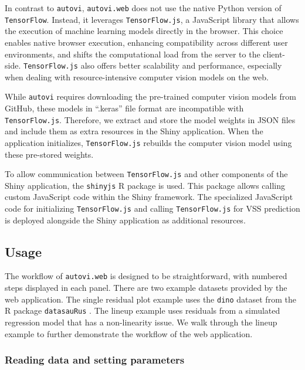 \documentclass[
doublespace,
  times]{anzsauth}
\begin{document}
In contrast to \texttt{autovi}, \texttt{autovi.web} does not use the
native Python version of \texttt{TensorFlow}. Instead, it leverages
\texttt{TensorFlow.js}, a JavaScript library that allows the execution
of machine learning models directly in the browser. This choice enables
native browser execution, enhancing compatibility across different user
environments, and shifts the computational load from the server to the
client-side. \texttt{TensorFlow.js} also offers better scalability and
performance, especially when dealing with resource-intensive computer
vision models on the web.

While \texttt{autovi} requires downloading the pre-trained computer
vision models from GitHub, these models in ``.keras'' file format are
incompatible with \texttt{TensorFlow.js}. Therefore, we extract and
store the model weights in JSON files and include them as extra
resources in the Shiny application. When the application initializes,
\texttt{TensorFlow.js} rebuilds the computer vision model using these
pre-stored weights.

To allow communication between \texttt{TensorFlow.js} and other
components of the Shiny application, the \texttt{shinyjs} R package
\citep{shinyjs} is used. This package allows calling custom JavaScript
code within the Shiny framework. The specialized JavaScript code for
initializing \texttt{TensorFlow.js} and calling \texttt{TensorFlow.js}
for VSS prediction is deployed alongside the Shiny application as
additional resources.

\subsection{Usage}\label{sec-autovi-web-workflow}

The workflow of \texttt{autovi.web} is designed to be straightforward,
with numbered steps displayed in each panel. There are two example
datasets provided by the web application. The single residual plot
example uses the \texttt{dino} dataset from the R package
\texttt{datasauRus} \citep{datasaurus}. The lineup example uses
residuals from a simulated regression model that has a non-linearity
issue. We walk through the lineup example to further demonstrate the
workflow of the web application.

\subsubsection{Reading data and setting
parameters}\label{reading-data-and-setting-parameters}
\end{document}
